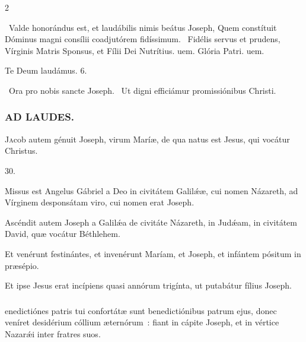 \documentclass[9pt,twoside]{extarticle}
\begin{document}
\begin{multicols}{2}
{{\begin{tightlist}{}
\item {}~Valde honorándus est, et laudábilis nimis beátus Joseph, \textred{*} Quem constítuit Dóminus magni consílii coadjutórem fidíssimum. ~Fidélis servus et prudens, Vírginis Matris Sponsus, et Fílii Dei Nutrítius. uem. Glória Patri. uem.
\item Te Deum laudámus. 6.
\item {}~Ora pro nobis sancte Joseph. ~Ut digni efficiámur promissiónibus Christi.
\end{tightlist}

\subsubsection*{\center \textsc{AD LAUDES.}}
\begin{center}\end{center}
\lettrine{J}acob autem génuit Joseph, virum Maríæ, de qua natus est Jesus, qui vocátur Christus.

\begin{tightlist}{}
\item {} 30.
\item {} Missus est Angelus Gábriel a Deo in civitátem Galilǽæ, cui nomen Názareth, ad Vírginem desponsátam viro, cui nomen erat Joseph.
\item {} Ascéndit autem Joseph a Galilǽa de civitáte Názareth, in Judǽam, in civitátem David, quæ vocátur Béthlehem.
\item {} Et venérunt festinántes, et invenérunt Maríam, et Joseph, et infántem pósitum in præsépio.
\item {} Et ipse Jesus erat incípiens quasi annórum trigínta, ut putabátur fílius Joseph.
\end{tightlist}

\subsubsection*{}
enedictiónes patris tui confortátæ sunt benedictiónibus patrum ejus, donec veníret desidérium cóllium æternórum~: fiant in cápite Joseph, et in vértice Nazarǽi inter fratres suos.

}}
\end{multicols}
\end{document}
